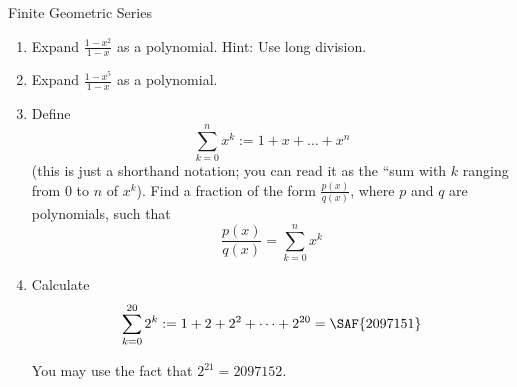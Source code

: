 \documentclass[12pt,letterpaper]{article}
\begin{document}
\begin{problem}{Finite Geometric Series}
  \begin{enumerate}
    \item Expand \(\frac{1-x^2}{1-x}\) as a polynomial. Hint: Use long division.
    \item Expand \(\frac{1-x^5}{1-x}\) as a polynomial.
    \item Define \[
      \sum_{k=0}^n x^k := 1 + x + \dots + x^n
    \] (this is just a shorthand notation; you can read it as the ``sum with $k$ ranging
    from $0$ to $n$ of $x^k$). Find a fraction of the form \(\frac{p(x)}{q(x)}\), where
    \(p\) and \(q\) are polynomials, such that \[
      \frac{p(x)}{q(x)} = \sum_{k=0}^n x^k
    \]
    \item Calculate \[
      \sum_{k=0}^{20} 2^k := 1 + 2 + 2^2 + \dots + 2^{20} = \SAF{2097151}
    \]

    You may use the fact that $2^{21} = 2097152$.
  \end{enumerate}
\end{problem}
\end{document}

